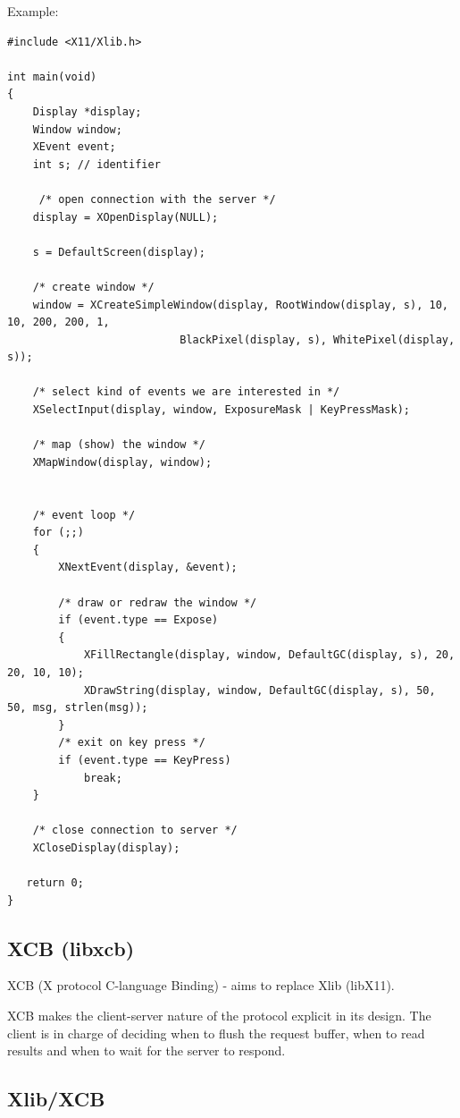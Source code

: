 Example:
\begin{verbatim}
#include <X11/Xlib.h>

int main(void)
{
    Display *display;
    Window window;
    XEvent event;
    int s; // identifier
    
     /* open connection with the server */
    display = XOpenDisplay(NULL);
    
    s = DefaultScreen(display);
    
    /* create window */
    window = XCreateSimpleWindow(display, RootWindow(display, s), 10, 10, 200, 200, 1,
                           BlackPixel(display, s), WhitePixel(display, s));
 
    /* select kind of events we are interested in */
    XSelectInput(display, window, ExposureMask | KeyPressMask);
 
    /* map (show) the window */
    XMapWindow(display, window);
    
    
    /* event loop */
    for (;;)
    {
        XNextEvent(display, &event);
 
        /* draw or redraw the window */
        if (event.type == Expose)
        {
            XFillRectangle(display, window, DefaultGC(display, s), 20, 20, 10, 10);
            XDrawString(display, window, DefaultGC(display, s), 50, 50, msg, strlen(msg));
        }
        /* exit on key press */
        if (event.type == KeyPress)
            break;
    }
 
    /* close connection to server */
    XCloseDisplay(display);

   return 0;
}
\end{verbatim}

\subsection{XCB (libxcb)}
\label{sec:XCB}
\label{sec:libxcb}

XCB (X protocol C-language Binding) - aims to replace Xlib (libX11).

XCB makes the client-server nature of the protocol explicit in its design. The
client is in charge of deciding when to flush the request buffer, when to read
results and when to wait for the server to respond.



\subsection{Xlib/XCB}

